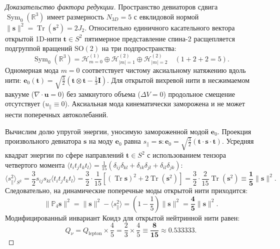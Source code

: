 \documentclass[11pt,a4paper]{article}
\theoremstyle{definition}
\theoremstyle{remark}
\begin{document}
\begin{proof}[Доказательство фактора редукции]
Пространство девиаторов сдвига $\operatorname{Sym}_0(\mathbb{R}^3)$ имеет размерность $N_{3D} = 5$ с евклидовой нормой $\|\mathbf{s}\|^2 = \operatorname{Tr}(\mathbf{s}^2) = 2J_2$. Относительно единичного касательного вектора открытой 1D-нити $\mathbf{t} \in S^2$ пятимерное представление спина-2 расщепляется подгруппой вращений $\mathrm{SO}(2)$ на три подпространства:
\begin{equation}
    \operatorname{Sym}_0(\mathbb{R}^3) = \mathcal{H}_{m=0}^{(1)} \oplus \mathcal{H}_{|m|=1}^{(2)} \oplus \mathcal{H}_{|m|=2}^{(2)} \quad (1 + 2 + 2 = 5).
\end{equation}
Одномерная мода $m=0$ соответствует чистому аксиальному натяжению вдоль нити: $\mathbf{e}_0(\mathbf{t}) = \sqrt{\frac{3}{2}}(\mathbf{t} \otimes \mathbf{t} - \frac{1}{3}\mathbf{I})$. Для открытой вихревой нити в несжимаемом вакууме ($\nabla \cdot \mathbf{u} = 0$) без замкнутого объема ($\Delta V = 0$) продольное смещение отсутствует ($u_\parallel \equiv 0$). Аксиальная мода кинематически заморожена и не может нести поперечных автоколебаний.

Вычислим долю упругой энергии, уносимую замороженной модой $\mathbf{e}_0$. Проекция произвольного девиатора $\mathbf{s}$ на моду $\mathbf{e}_0$ равна $s_\parallel = \mathbf{s} : \mathbf{e}_0 = \sqrt{\frac{3}{2}}(\mathbf{t} \cdot \mathbf{s} \cdot \mathbf{t})$. Усредняя квадрат энергии по сфере направлений $\mathbf{t} \in S^2$ с использованием тензора четвертого момента $\langle t_i t_j t_k t_l \rangle = \frac{1}{15}(\delta_{ij}\delta_{kl} + \delta_{ik}\delta_{jl} + \delta_{il}\delta_{jk})$:
\begin{equation}
    \langle s_\parallel^2 \rangle_{S^2} = \frac{3}{2} s_{ij} s_{kl} \langle t_i t_j t_k t_l \rangle = \frac{3}{2} \cdot \frac{1}{15} \left[ (\operatorname{Tr}\mathbf{s})^2 + 2\operatorname{Tr}(\mathbf{s}^2) \right] = \frac{3}{2} \cdot \frac{2}{15} \operatorname{Tr}(\mathbf{s}^2) \equiv \frac{\mathbf{1}}{\mathbf{5}} \|\mathbf{s}\|^2.
    \label{eq:axial_mode_one_fifth_exact}
\end{equation}
Следовательно, на динамические поперечные моды открытой нити приходится:
\begin{equation}
    \|\mathbb{P}_4 \mathbf{s}\|^2 = \|\mathbf{s}\|^2 - \langle s_\parallel^2 \rangle = \left( 1 - \frac{1}{5} \right) \|\mathbf{s}\|^2 = \frac{\mathbf{4}}{\mathbf{5}} \|\mathbf{s}\|^2.
\end{equation}
Модифицированный инвариант Коидэ для открытой нейтринной нити равен:
\begin{equation}
    Q_\nu = Q_{\mathrm{lepton}} \times \frac{4}{5} = \frac{2}{3} \times \frac{4}{5} \equiv \frac{\mathbf{8}}{\mathbf{15}} \approx 0.533333.
\end{equation}
\end{proof}
	
\end{document}
